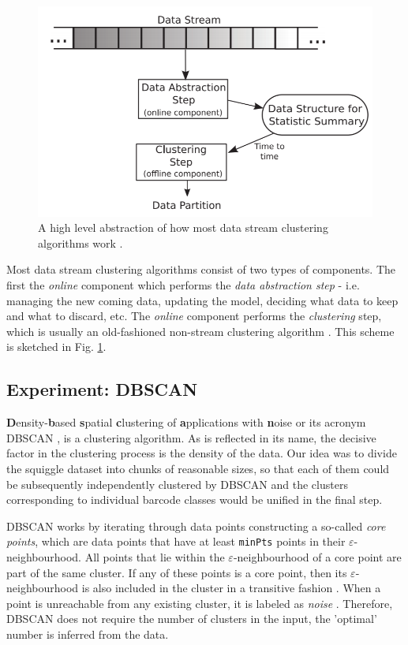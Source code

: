 \begin{figure}[]
    \centering
    \includegraphics[width=15.5cm]{images/stream_clustering_scheme.png}
    \caption[Clustering of data streams scheme]{A high level abstraction of how most data stream clustering algorithms work \cite{silva2013data}.}
    \label{fig:stream_clustering}
\end{figure}

Most data stream clustering algorithms consist of two types of components. The first the \textit{online} component which performs the \textit{data abstraction step} - i.e. managing the new coming data, updating the model, deciding what data to keep and what to discard, etc. The \textit{online} component performs the \textit{clustering} step, which is usually an old-fashioned non-stream clustering algorithm \cite{silva2013data}. This scheme is sketched in Fig. \ref{fig:stream_clustering}.

\subsection{Experiment: DBSCAN}
\textbf{D}ensity-\textbf{b}ased \textbf{s}patial \textbf{c}lustering of \textbf{a}pplications with \textbf{n}oise or its acronym DBSCAN \cite{schubert2017dbscan}, is a clustering algorithm. As is reflected in its name, the decisive factor in the clustering process is the density of the data. Our idea was to divide the squiggle dataset into chunks of reasonable sizes, so that each of them could be subsequently independently clustered by DBSCAN and the clusters corresponding to individual barcode classes would be unified in the final step.

DBSCAN works by iterating through data points constructing a so-called \textit{core points}, which are data points that have at least \texttt{minPts} points in their $\varepsilon$-neighbourhood. All points that lie within the $\varepsilon$-neighbourhood of a core point are part of the same cluster. If any of these points is a core point, then its $\varepsilon$-neighbourhood is also included in the cluster in a transitive fashion \cite{schubert2017dbscan}. When a point is unreachable from any existing cluster, it is labeled as \textit{noise} \cite{schubert2017dbscan}. Therefore, DBSCAN does not require the number of clusters in the input, the 'optimal' number is inferred from the data.

